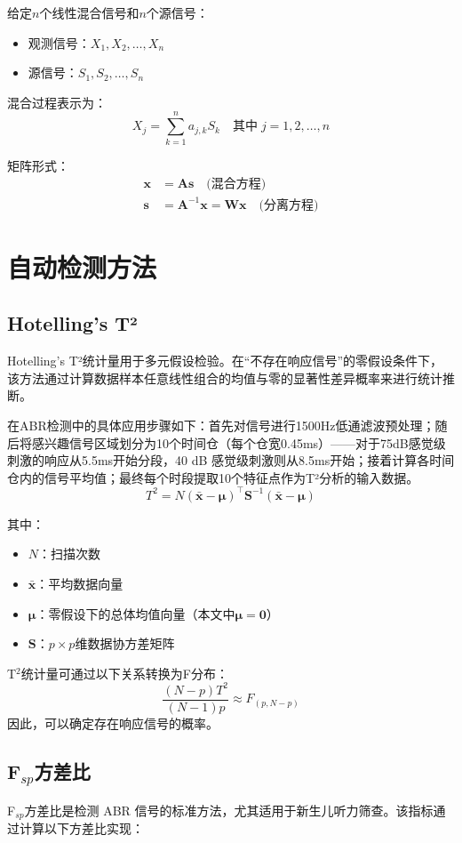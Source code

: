 给定$n$个线性混合信号和$n$个源信号：
\begin{itemize}
    \item 观测信号：$X_1, X_2, \ldots, X_n$
    \item 源信号：$S_1, S_2, \ldots, S_n$
\end{itemize}

\noindent 混合过程表示为：
\[
X_j = \sum_{k=1}^n a_{j,k}S_k \quad \text{其中}\; j = 1,2,\ldots,n
\]

\noindent 矩阵形式：
\begin{align*}
\mathbf{x} &= \mathbf{A}\mathbf{s} \quad \text{(混合方程)} \\
\mathbf{s} &= \mathbf{A}^{-1}\mathbf{x} = \mathbf{W}\mathbf{x} \quad \text{(分离方程)}
\end{align*}
\section{自动检测方法}
\subsection*{Hotelling's T²}
Hotelling's T²统计量用于多元假设检验。在“不存在响应信号”的零假设条件下，该方法通过计算数据样本任意线性组合的均值与零的显著性差异概率来进行统计推断。

在ABR检测中的具体应用步骤如下：首先对信号进行1500Hz低通滤波预处理；随后将感兴趣信号区域划分为10个时间仓（每个仓宽0.45ms）——对于75dB感觉级刺激的响应从5.5ms开始分段，40 dB 感觉级刺激则从8.5ms开始；接着计算各时间仓内的信号平均值；最终每个时段提取10个特征点作为T²分析的输入数据。
\[
T^2 = N(\bar{\mathbf{x}} - \boldsymbol{\mu})^\top \mathbf{S}^{-1}(\bar{\mathbf{x}} - \boldsymbol{\mu})
\]

其中：
\begin{itemize}
    \item $N$：扫描次数
    \item $\bar{\mathbf{x}}$：平均数据向量
    \item $\boldsymbol{\mu}$：零假设下的总体均值向量（本文中$\boldsymbol{\mu} = \mathbf{0}$）
    \item $\mathbf{S}$：$p \times p$维数据协方差矩阵
\end{itemize}

T$^2$统计量可通过以下关系转换为F分布：
\[
\frac{(N - p)T^2}{(N - 1)p} \approx F_{(p, N - p)}
\]
因此，可以确定存在响应信号的概率。
\subsection*{F$_{sp}$方差比}
F$_{sp}$方差比是检测 ABR 信号的标准方法，尤其适用于新生儿听力筛查。该指标通过计算以下方差比实现：

